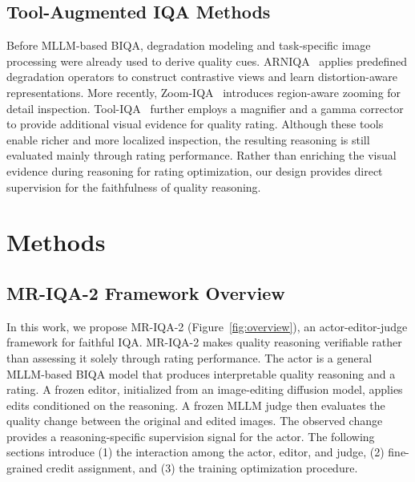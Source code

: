 \documentclass[letterpaper]{article} %
\begin{document}
\subsection{Tool-Augmented IQA Methods}

Before MLLM-based BIQA, degradation modeling and task-specific image processing were already used to derive quality cues. ARNIQA~\citep{arniqa} applies predefined degradation operators to construct contrastive views and learn distortion-aware representations. More recently, Zoom-IQA~\citep{zoom-iqa} introduces region-aware zooming for detail inspection. Tool-IQA~\citep{tool-iqa} further employs a magnifier and a gamma corrector to provide additional visual evidence for quality rating. Although these tools enable richer and more localized inspection, the resulting reasoning is still evaluated mainly through rating performance. Rather than enriching the visual evidence during reasoning for rating optimization, our design provides direct supervision for the faithfulness of quality reasoning.

\section{Methods}
\label{sec:methods}

\subsection{MR-IQA-2 Framework Overview}
In this work, we propose MR-IQA-2 (Figure~\ref{fig:overview}), an actor-editor-judge framework for faithful IQA. MR-IQA-2 makes quality reasoning verifiable rather than assessing it solely through rating performance. The actor is a general MLLM-based BIQA model that produces interpretable quality reasoning and a rating. A frozen editor, initialized from an image-editing diffusion model, applies edits conditioned on the reasoning. A frozen MLLM judge then evaluates the quality change between the original and edited images. The observed change provides a reasoning-specific supervision signal for the actor. The following sections introduce (1) the interaction among the actor, editor, and judge, (2) fine-grained credit assignment, and (3) the training optimization procedure.
\end{document}
